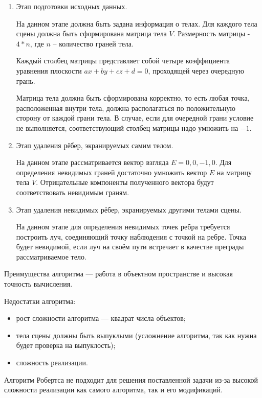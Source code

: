 \begin{enumerate}
	\item Этап подготовки исходных данных.
	
	На данном этапе должна быть задана информация о телах. Для каждого тела сцены должна быть сформирована матрица тела $V$. Размерность матрицы - $4 * n$, где $n$ – количество граней тела.
	
	Каждый столбец матрицы представляет собой четыре коэффициента уравнения плоскости $ax + by + cz + d = 0$, проходящей через очередную грань.
	
	Матрица тела должна быть сформирована корректно, то есть любая точка, расположенная внутри тела, должна располагаться по положительную сторону от каждой грани тела. В случае, если для очередной грани условие не выполняется, соответствующий столбец матрицы надо умножить на $-1$. 
	
	\item Этап удаления рёбер, экранируемых самим телом.
	
	На данном этапе рассматривается вектор взгляда $E = {0, 0, -1, 0}$.
	Для определения невидимых граней достаточно умножить вектор $E$ на матрицу тела $V$. Отрицательные компоненты полученного вектора будут соответствовать невидимым граням.
	
	\item Этап удаления невидимых рёбер, экранируемых другими телами сцены.
	
	На данном этапе для определения невидимых точек ребра требуется построить луч, соединяющий точку наблюдения с точкой на ребре. Точка будет невидимой, если луч на своём пути встречает в качестве преграды рассматриваемое тело.
	
\end{enumerate}

Преимущества алгоритма --- работа в объектном пространстве и высокая точность вычисления.

Недостатки алгоритма:
\begin{itemize}
	\item рост сложности алгоритма --- квадрат числа объектов;
	\item тела сцены должны быть выпуклыми (усложнение алгоритма, так как нужна будет проверка на выпуклость);
	\item сложность реализации.
\end{itemize}

Алгоритм Робертса не подходит для решения поставленной задачи из-за высокой сложности реализации как самого алгоритма, так и его модификаций.


